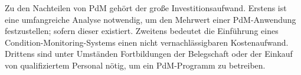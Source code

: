 Zu den Nachteilen von PdM gehört der große Investitionsaufwand. Erstens ist eine umfangreiche Analyse notwendig, um den Mehrwert einer PdM-Anwendung festzustellen; sofern dieser existiert. Zweitens bedeutet die Einführung eines Condition-Monitoring-Systems einen nicht vernachlässigbaren Kostenaufwand. Drittens sind unter Umständen Fortbildungen der Belegschaft oder der Einkauf von qualifiziertem Personal nötig, um ein PdM-Programm zu betreiben. 
